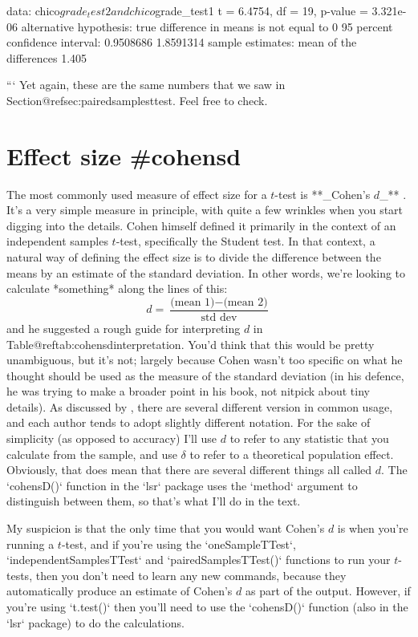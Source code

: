 data:  chico$grade_test2 and chico$grade_test1
t = 6.4754, df = 19, p-value = 3.321e-06
alternative hypothesis: true difference in means is not equal to 0
95 percent confidence interval:
 0.9508686 1.8591314
sample estimates:
mean of the differences 
                  1.405 

```
Yet again, these are the same numbers that we saw in Section@refsec:pairedsamplesttest. Feel free to check. 



\section{Effect size {#cohensd}}


The most commonly used measure of effect size for a $t$-test is **_Cohen's $d$_** \cite{Cohen1988}. It's a very simple measure in principle, with quite a few wrinkles when you start digging into the details. Cohen himself defined it primarily in the context of an independent samples $t$-test, specifically the Student test. In that context, a natural way of defining the effect size is to divide the difference between the means by an estimate of the standard deviation. In other words, we're looking to calculate *something* along the lines of this:
$$
d = \frac{\mbox{(mean 1)} - \mbox{(mean 2)}}{\mbox{std dev}}
$$
and he suggested a rough guide for interpreting $d$ in Table@reftab:cohensdinterpretation. You'd think that this would be pretty unambiguous, but it's not; largely because Cohen wasn't too specific on what he thought should be used as the measure of the standard deviation (in his defence, he was trying to make a broader point in his book, not nitpick about tiny details). As discussed by , there are several different version in common usage, and each author tends to adopt slightly different notation. For the sake of simplicity (as opposed to accuracy) I'll use $d$ to refer to any statistic that you calculate from the sample, and  use $\delta$ to refer to a theoretical population effect. Obviously, that does mean that there are several different things all called $d$. The `cohensD()` function in the `lsr` package uses the `method` argument to distinguish between them, so that's what I'll do in the text.

My suspicion is that the only time that you would want Cohen's $d$ is when you're running a $t$-test, and if you're using the `oneSampleTTest`, `independentSamplesTTest` and `pairedSamplesTTest()` functions to run your $t$-tests, then you don't need to learn any new commands, because they automatically produce an estimate of Cohen's $d$ as part of the output. However, if you're using `t.test()` then you'll need to use the `cohensD()` function (also in the `lsr` package) to do the calculations. 


